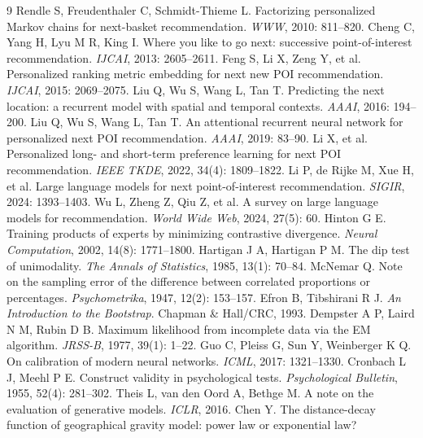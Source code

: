 \documentclass[UTF8,zihao=-4,a4paper]{ctexart}
\begin{document}
\begin{thebibliography}{9}\small
{} Rendle S, Freudenthaler C, Schmidt-Thieme L.
Factorizing personalized Markov chains for next-basket recommendation.
\emph{WWW}, 2010: 811--820.
 Cheng C, Yang H, Lyu M R, King I.
Where you like to go next: successive point-of-interest recommendation.
\emph{IJCAI}, 2013: 2605--2611.
 Feng S, Li X, Zeng Y, et al.
Personalized ranking metric embedding for next new POI recommendation.
\emph{IJCAI}, 2015: 2069--2075.
 Liu Q, Wu S, Wang L, Tan T.
Predicting the next location: a recurrent model with spatial and temporal contexts.
\emph{AAAI}, 2016: 194--200.
 Liu Q, Wu S, Wang L, Tan T.
An attentional recurrent neural network for personalized next POI recommendation.
\emph{AAAI}, 2019: 83--90.
 Li X, et al.
Personalized long- and short-term preference learning for next POI recommendation.
\emph{IEEE TKDE}, 2022, 34(4): 1809--1822.
 Li P, de Rijke M, Xue H, et al.
Large language models for next point-of-interest recommendation.
\emph{SIGIR}, 2024: 1393--1403.
 Wu L, Zheng Z, Qiu Z, et al.
A survey on large language models for recommendation.
\emph{World Wide Web}, 2024, 27(5): 60.
 Hinton G E.
Training products of experts by minimizing contrastive divergence.
\emph{Neural Computation}, 2002, 14(8): 1771--1800.
 Hartigan J A, Hartigan P M.
The dip test of unimodality.
\emph{The Annals of Statistics}, 1985, 13(1): 70--84.
 McNemar Q.
Note on the sampling error of the difference between correlated proportions or percentages.
\emph{Psychometrika}, 1947, 12(2): 153--157.
 Efron B, Tibshirani R J.
\emph{An Introduction to the Bootstrap}. Chapman \& Hall/CRC, 1993.
 Dempster A P, Laird N M, Rubin D B.
Maximum likelihood from incomplete data via the EM algorithm.
\emph{JRSS-B}, 1977, 39(1): 1--22.
 Guo C, Pleiss G, Sun Y, Weinberger K Q.
On calibration of modern neural networks.
\emph{ICML}, 2017: 1321--1330.
 Cronbach L J, Meehl P E.
Construct validity in psychological tests.
\emph{Psychological Bulletin}, 1955, 52(4): 281--302.
 Theis L, van den Oord A, Bethge M.
A note on the evaluation of generative models.
\emph{ICLR}, 2016.
 Chen Y.
The distance-decay function of geographical gravity model: power law or exponential law?

\end{thebibliography}
\end{document}
